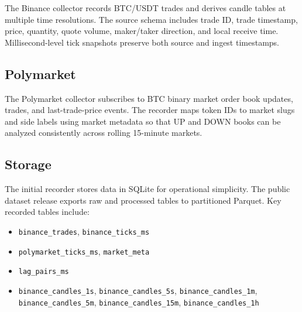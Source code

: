 The Binance collector records BTC/USDT trades and derives candle tables at
multiple time resolutions. The source schema includes trade ID, trade timestamp,
price, quantity, quote volume, maker/taker direction, and local receive time.
Millisecond-level tick snapshots preserve both source and ingest timestamps.

\subsection{Polymarket}
\label{sec:data-polymarket}

The Polymarket collector subscribes to BTC binary market order book updates,
trades, and last-trade-price events. The recorder maps token IDs to market slugs
and side labels using market metadata so that UP and DOWN books can be analyzed
consistently across rolling 15-minute markets.

\subsection{Storage}
\label{sec:data-storage}

The initial recorder stores data in SQLite for operational simplicity. The
public dataset release exports raw and processed tables to partitioned Parquet.
Key recorded tables include:
\begin{itemize}
  \item \texttt{binance\_trades}, \texttt{binance\_ticks\_ms}
  \item \texttt{polymarket\_ticks\_ms}, \texttt{market\_meta}
  \item \texttt{lag\_pairs\_ms}
  \item \texttt{binance\_candles\_1s}, \texttt{binance\_candles\_5s},
        \texttt{binance\_candles\_1m}, \texttt{binance\_candles\_5m},
        \texttt{binance\_candles\_15m}, \texttt{binance\_candles\_1h}
\end{itemize}
